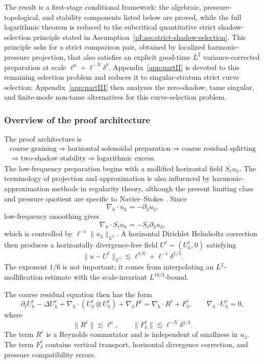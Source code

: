 \documentclass[11pt]{article}
\numberwithin{equation}{section}
\theoremstyle{plain}
\theoremstyle{definition}
\theoremstyle{remark}
\newcommand{\nabh}{\nabla_h}
\newcommand{\divh}{\nabla_h\!\cdot}
\begin{document}
The result is a first-stage conditional framework: the algebraic, pressure-topological, and stability components listed below are proved, while the full logarithmic theorem is reduced to the subcritical quantitative strict shadow-selection principle stated in Assumption~\ref{pI:ass:strict-shadow-selection}.  This principle asks for a strict comparison pair, obtained by localized harmonic-pressure projection, that also satisfies an explicit good-time \(L^2\) variance-corrected preparation at scale \(\ell^\mu+\ell^{-N}\delta^b\).  Appendix~\ref{app:partII} is devoted to this remaining selection problem and reduces it to singular-stratum strict curve selection; Appendix~\ref{app:partIII} then analyzes the zero-shadow, tame singular, and finite-mode non-tame alternatives for this curve-selection problem.

\subsubsection{Overview of the proof architecture}

The proof architecture is
\[
\boxed{
\begin{gathered}
\text{coarse graining}
\Longrightarrow
\text{horizontal solenoidal preparation}
\Longrightarrow
\text{coarse residual splitting}\\
\Longrightarrow
\text{two-shadow stability}
\Longrightarrow
\text{logarithmic excess}.
\end{gathered}
}
\]
The low-frequency preparation begins with a mollified horizontal field \(S_\ell u_h\).  The terminology of projection and approximation is also influenced by harmonic-approximation methods in regularity theory, although the present limiting class and pressure quotient are specific to Navier--Stokes \cite{DuzaarMingione2004}.  Since
\[
        \divh u_h=-\partial_3u_3,
\]
low-frequency smoothing gives
\[
        \divh S_\ell u_h=-S_\ell\partial_3u_3,
\]
which is controlled by \(\ell^{-1}\|u_3\|_{L^3}\).  A horizontal Dirichlet Helmholtz correction then produces a horizontally divergence-free field \(U^\ell=(U_h^\ell,0)\) satisfying
\[
        \|u-U^\ell\|_{L^3}\lesssim
        \ell^{1/6}+\ell^{-1}\delta^{1/3}.
\]
The exponent \(1/6\) is not important; it comes from interpolating an \(L^2\)-mollification estimate with the scale-invariant \(L^{10/3}\)-bound.

The coarse residual equation then has the form
\begin{equation}\label{pI:eq:intro-residual}
        \partial_t U_h^\ell-\Delta U_h^\ell
        +\divh(U_h^\ell\otimes U_h^\ell)
        +\nabh P^\ell
        =\divh R^\ell+F_\delta^\ell,
        \qquad
        \divh U_h^\ell=0,
\end{equation}
where
\[
        \|R^\ell\|\lesssim \ell^a,
        \qquad
        \|F_\delta^\ell\|\lesssim \ell^{-N}\delta^{1/3}.
\]
The term \(R^\ell\) is a Reynolds commutator and is independent of smallness in \(u_3\).  The term \(F_\delta^\ell\) contains vertical transport, horizontal divergence correction, and pressure compatibility errors.
\end{document}
